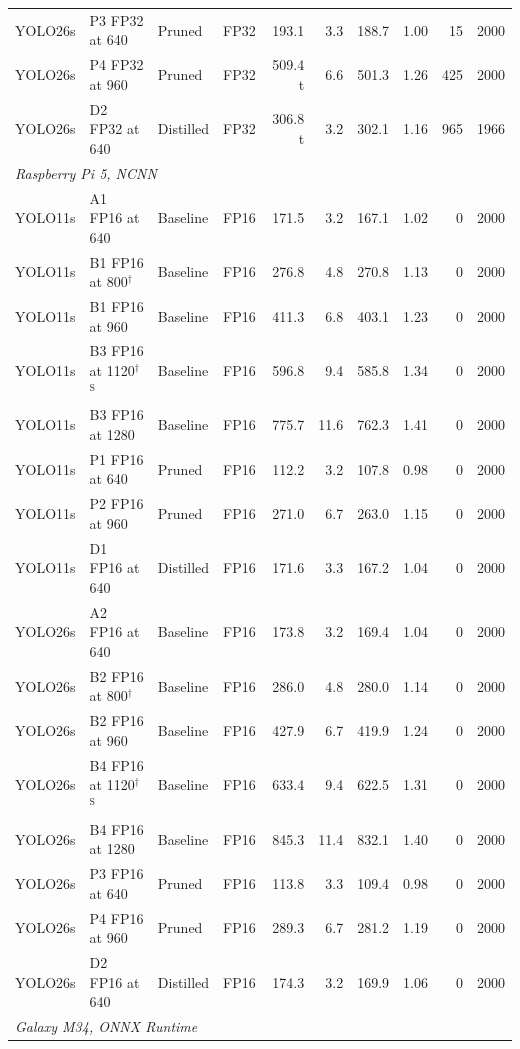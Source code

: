\begin{longtable}{llllrrrrrr}
YOLO26s & P3 FP32 at 640 & Pruned & FP32 & 193.1 & 3.3 & 188.7 & 1.00 & 15 & 2000 \\
YOLO26s & P4 FP32 at 960 & Pruned & FP32 & 509.4 t & 6.6 & 501.3 & 1.26 & 425 & 2000 \\
YOLO26s & D2 FP32 at 640 & Distilled & FP32 & 306.8 t & 3.2 & 302.1 & 1.16 & 965 & 1966 \\
\midrule
\multicolumn{10}{l}{\textit{Raspberry Pi 5, NCNN}} \\
YOLO11s & A1 FP16 at 640 & Baseline & FP16 & 171.5 & 3.2 & 167.1 & 1.02 & 0 & 2000 \\
YOLO11s & B1 FP16 at 800$^{\dagger}$ & Baseline & FP16 & 276.8 & 4.8 & 270.8 & 1.13 & 0 & 2000 \\
YOLO11s & B1 FP16 at 960 & Baseline & FP16 & 411.3 & 6.8 & 403.1 & 1.23 & 0 & 2000 \\
YOLO11s & B3 FP16 at 1120$^{\dagger}$$^{\mathrm{S}}$ & Baseline & FP16 & 596.8 & 9.4 & 585.8 & 1.34 & 0 & 2000 \\
YOLO11s & B3 FP16 at 1280 & Baseline & FP16 & 775.7 & 11.6 & 762.3 & 1.41 & 0 & 2000 \\
YOLO11s & P1 FP16 at 640 & Pruned & FP16 & 112.2 & 3.2 & 107.8 & 0.98 & 0 & 2000 \\
YOLO11s & P2 FP16 at 960 & Pruned & FP16 & 271.0 & 6.7 & 263.0 & 1.15 & 0 & 2000 \\
YOLO11s & D1 FP16 at 640 & Distilled & FP16 & 171.6 & 3.3 & 167.2 & 1.04 & 0 & 2000 \\
YOLO26s & A2 FP16 at 640 & Baseline & FP16 & 173.8 & 3.2 & 169.4 & 1.04 & 0 & 2000 \\
YOLO26s & B2 FP16 at 800$^{\dagger}$ & Baseline & FP16 & 286.0 & 4.8 & 280.0 & 1.14 & 0 & 2000 \\
YOLO26s & B2 FP16 at 960 & Baseline & FP16 & 427.9 & 6.7 & 419.9 & 1.24 & 0 & 2000 \\
YOLO26s & B4 FP16 at 1120$^{\dagger}$$^{\mathrm{S}}$ & Baseline & FP16 & 633.4 & 9.4 & 622.5 & 1.31 & 0 & 2000 \\
YOLO26s & B4 FP16 at 1280 & Baseline & FP16 & 845.3 & 11.4 & 832.1 & 1.40 & 0 & 2000 \\
YOLO26s & P3 FP16 at 640 & Pruned & FP16 & 113.8 & 3.3 & 109.4 & 0.98 & 0 & 2000 \\
YOLO26s & P4 FP16 at 960 & Pruned & FP16 & 289.3 & 6.7 & 281.2 & 1.19 & 0 & 2000 \\
YOLO26s & D2 FP16 at 640 & Distilled & FP16 & 174.3 & 3.2 & 169.9 & 1.06 & 0 & 2000 \\
\midrule
\multicolumn{10}{l}{\textit{Galaxy M34, ONNX Runtime}} \\

\end{longtable}
